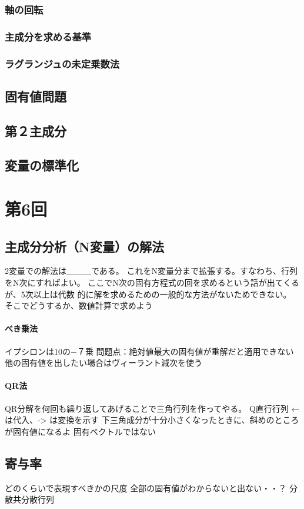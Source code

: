 \documentclass{jsarticle}
\begin{document}
\subsubsection{軸の回転}
\subsubsection{主成分を求める基準}
\subsubsection{ラグランジュの未定乗数法}
\subsection{固有値問題}
\subsection{第２主成分}
\subsection{変量の標準化}

\section{第6回}
\subsection{主成分分析（N変量）の解法}
2変量での解法は＿＿＿である。
これをN変量分まで拡張する。すなわち、行列をN次にすればよい。
ここでN次の固有方程式の回を求めるという話が出てくるが、5次以上は代数
的に解を求めるための一般的な方法がないためできない。
そこでどうするか、数値計算で求めよう

\paragraph{べき乗法}
イプシロンは10の−７乗
問題点：絶対値最大の固有値が重解だと適用できない
他の固有値を出したい場合はヴィーラント減次を使う

\paragraph{QR法}
QR分解を何回も繰り返してあげることで三角行列を作ってやる。
Q直行行列
←は代入、-> は変換を示す
下三角成分が十分小さくなったときに、斜めのところが固有値になるよ
固有ベクトルではない

\subsection{寄与率}
どのくらいで表現すべきかの尺度
全部の固有値がわからないと出ない・・？
分散共分散行列
\end{document}
